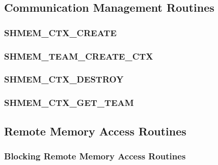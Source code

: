 \documentclass[10pt,oneside]{book}
\begin{document}
\subsection{Communication Management Routines}\label{sec:ctx}


\subsubsection{\textbf{SHMEM\_CTX\_CREATE}}
\label{subsec:shmem_ctx_create}


\subsubsection{\textbf{SHMEM\_TEAM\_CREATE\_CTX}}
\label{subsec:shmem_team_create_ctx}


\subsubsection{\textbf{SHMEM\_CTX\_DESTROY}}
\label{subsec:shmem_ctx_destroy}


\subsubsection{\textbf{SHMEM\_CTX\_GET\_TEAM}}
\label{subsec:shmem_ctx_get_team}


\subsection{Remote Memory Access Routines}\label{sec:rma}


\subsubsection{Blocking Remote Memory Access Routines}\label{subsec:rma}
\label{subsec:shmem_put}


\label{subsec:shmem_p}


\label{subsec:shmem_iput}


\label{subsec:shmem_ibput}

\end{document}

